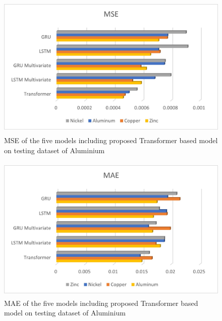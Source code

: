 \documentclass{ws-ijait}
\begin{document}
\begin{center}
	\begin{figure}[!htbp]
		\centering
		\includegraphics[width=15cm, height=7cm]{MSE.jpg}
		\caption{MSE of the five models including proposed Transformer based model on testing dataset of Aluminium}
		\label{figr1}
	\end{figure}
\end{center}

\begin{center}
	\begin{figure}[!htbp]
		\centering
		\includegraphics[width=15cm, height=7cm]{MAE.jpg}
		\caption{MAE of the five models including proposed Transformer based model on testing dataset of Aluminium}
		\label{figr1}
	\end{figure}
\end{center}
\end{document}
